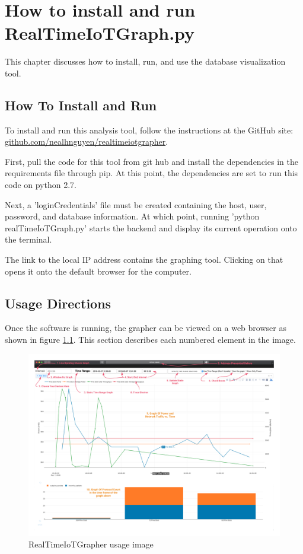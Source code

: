 \chapter{How to install and run RealTimeIoTGraph.py}
\label{How to install and run RealTimeIoTGraph.py}
%
This chapter discusses how to install, run, and use the database visualization tool.

\section{How To Install and Run}
To install and run this analysis tool, follow the instructions at the GitHub site:   \href{https://github.com/nealhnguyen/RealTimeIoTGrapher}{github.com/nealhnguyen/realtimeiotgrapher}.

First, pull the code for this tool from git hub and install the dependencies in the requirements file through pip. At this point, the dependencies are set to run this code on python 2.7.

Next, a 'loginCredentials' file must be created containing the host, user, password, and database information. At which point, running 'python realTimeIoTGraph.py' starts the backend and display its current operation onto the terminal.

The link to the local IP address contains the graphing tool. Clicking on that opens it onto the default browser for the computer.

\section{Usage Directions}
Once the software is running, the grapher can be viewed on a web browser as shown in figure \ref{fig:grapherUsage}. This section describes each numbered element in the image.

\begin{figure}[H]
    \centering
    \includegraphics[width=1\textwidth]{figures/grapherUsage.png}
    \caption{RealTimeIoTGrapher usage image}
    \label{fig:grapherUsage}
\end{figure}

